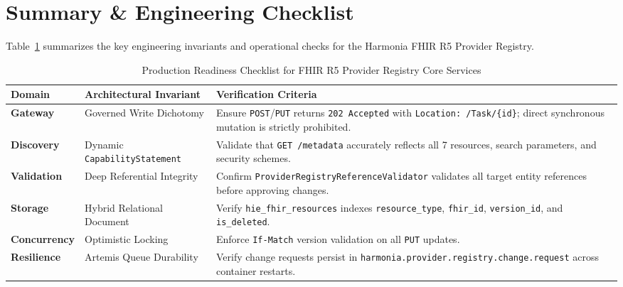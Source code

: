 \section{Summary \& Engineering Checklist}
\label{sec:pr_checklist}

Table~\ref{tab:pr_readiness_checklist} summarizes the key engineering invariants and operational checks for the Harmonia FHIR R5 Provider Registry.

\begin{table}[htbp]
\centering
\small
\begin{tabularx}{\textwidth}{l p{4.5cm} X}
\toprule
\textbf{Domain} & \textbf{Architectural Invariant} & \textbf{Verification Criteria} \\
\midrule
\textbf{Gateway} & Governed Write Dichotomy & Ensure \texttt{POST}/\texttt{PUT} returns \texttt{202 Accepted} with \texttt{Location: /Task/\{id\}}; direct synchronous mutation is strictly prohibited. \\
\textbf{Discovery} & Dynamic \texttt{CapabilityStatement} & Validate that \texttt{GET /metadata} accurately reflects all 7 resources, search parameters, and security schemes. \\
\textbf{Validation} & Deep Referential Integrity & Confirm \texttt{ProviderRegistryReferenceValidator} validates all target entity references before approving changes. \\
\textbf{Storage} & Hybrid Relational Document & Verify \texttt{hie\_fhir\_resources} indexes \texttt{resource\_type}, \texttt{fhir\_id}, \texttt{version\_id}, and \texttt{is\_deleted}. \\
\textbf{Concurrency}& Optimistic Locking & Enforce \texttt{If-Match} version validation on all \texttt{PUT} updates. \\
\textbf{Resilience} & Artemis Queue Durability & Verify change requests persist in \texttt{harmonia.provider.registry.change.request} across container restarts. \\
\bottomrule
\end{tabularx}
\caption{Production Readiness Checklist for FHIR R5 Provider Registry Core Services}
\label{tab:pr_readiness_checklist}
\end{table}

\newpage
